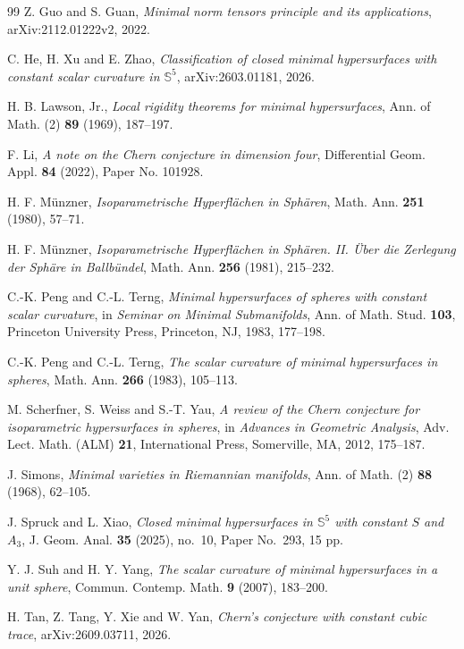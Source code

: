 \documentclass[11pt,reqno]{amsart}
\numberwithin{equation}{section}
\begin{document}
\begin{thebibliography}{99}
Z. Guo and S. Guan,
\emph{Minimal norm tensors principle and its applications},
arXiv:2112.01222v2, 2022.

C. He, H. Xu and E. Zhao,
\emph{Classification of closed minimal hypersurfaces with constant scalar curvature in $\mathbb S^5$},
arXiv:2603.01181, 2026.

H. B. Lawson, Jr.,
\emph{Local rigidity theorems for minimal hypersurfaces},
Ann. of Math. (2) \textbf{89} (1969), 187--197.

F. Li,
\emph{A note on the Chern conjecture in dimension four},
Differential Geom. Appl. \textbf{84} (2022), Paper No. 101928.

H. F. M\"unzner,
\emph{Isoparametrische Hyperfl\"achen in Sph\"aren},
Math. Ann. \textbf{251} (1980), 57--71.

H. F. M\"unzner,
\emph{Isoparametrische Hyperfl\"achen in Sph\"aren. II. \"Uber die Zerlegung der Sph\"are in Ballb\"undel},
Math. Ann. \textbf{256} (1981), 215--232.

C.-K. Peng and C.-L. Terng,
\emph{Minimal hypersurfaces of spheres with constant scalar curvature},
in \emph{Seminar on Minimal Submanifolds}, Ann. of Math. Stud. \textbf{103},
Princeton University Press, Princeton, NJ, 1983, 177--198.

C.-K. Peng and C.-L. Terng,
\emph{The scalar curvature of minimal hypersurfaces in spheres},
Math. Ann. \textbf{266} (1983), 105--113.

M. Scherfner, S. Weiss and S.-T. Yau,
\emph{A review of the Chern conjecture for isoparametric hypersurfaces in spheres},
in \emph{Advances in Geometric Analysis}, Adv. Lect. Math. (ALM) \textbf{21},
International Press, Somerville, MA, 2012, 175--187.

J. Simons,
\emph{Minimal varieties in Riemannian manifolds},
Ann. of Math. (2) \textbf{88} (1968), 62--105.

J. Spruck and L. Xiao,
\emph{Closed minimal hypersurfaces in $\mathbb S^5$ with constant $S$ and $A_3$},
J. Geom. Anal. \textbf{35} (2025), no.~10, Paper No.~293, 15 pp.

Y. J. Suh and H. Y. Yang,
\emph{The scalar curvature of minimal hypersurfaces in a unit sphere},
Commun. Contemp. Math. \textbf{9} (2007), 183--200.

H. Tan, Z. Tang, Y. Xie and W. Yan,
\emph{Chern's conjecture with constant cubic trace},
arXiv:2609.03711, 2026.


\end{thebibliography}
\end{document}

